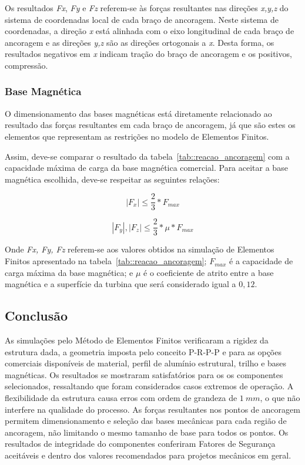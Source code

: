 Os resultados \textit{Fx}, \textit{Fy} e \textit{Fz} referem-se às forças
resultantes nas direções \textit{x,y,z} do sistema de coordenadas local de cada
braço de ancoragem. Neste sistema de coordenadas, a direção \textit{x} está
alinhada com o eixo longitudinal de cada braço de ancoragem e as direções
\textit{y,z} são as direções ortogonais a \textit{x}. 
Desta forma, os resultados negativos em \textit{x} indicam tração do
braço de ancoragem e os positivos, compressão.

\subsubsection{Base Magnética}

O dimensionamento das bases magnéticas está diretamente relacionado ao resultado
das forças resultantes em cada braço de ancoragem, já que são estes os elementos
que representam as restrições no modelo de Elementos Finitos.

Assim, deve-se comparar o resultado da tabela~\ref{tab::reacao_ancoragem} com a
capacidade máxima de carga da base magnética comercial. Para aceitar a base
magnética escolhida, deve-se respeitar as seguintes relações:

 \begin{equation*}
	|F_{x}|\leq\frac{2}{3}*F_{max}
\end{equation*}

 \begin{equation*}
	|F_{y}|,|F_{z}|\leq\frac{2}{3}*\mu*F_{max}
\end{equation*}

Onde \textit{Fx, Fy, Fz} referem-se aos valores obtidos na simulação de
Elementos Finitos apresentado na tabela~\ref{tab::reacao_ancoragem};
$F_{max}$ é a capacidade de carga máxima da base magnética; e $\mu$ é o
coeficiente de atrito entre a base magnética e a superfície da turbina que será
considerado igual a $0,12$.

\subsection{Conclusão}
As simulações pelo Método de Elementos Finitos verificaram a rigidez da
estrutura dada, a geometria imposta pelo conceito P-R-P-P e para as opções
comerciais disponíveis de material, perfil de alumínio estrutural, trilho e bases
magnéticas.
Os resultados se mostraram satisfatórios para os os componentes selecionados,
ressaltando que foram considerados casos extremos de operação. A flexibilidade
da estrutura causa erros com ordem de grandeza de $1~mm$, o que não interfere na
qualidade do processo.
As forças resultantes nos pontos de ancoragem permitem dimensionamento e seleção
das bases mecânicas para cada região de ancoragem, não limitando o mesmo tamanho
de base para todos os pontos.
Os resultados de integridade do componentes conferiram Fatores de Segurança
aceitáveis e dentro dos valores recomendados para projetos mecânicos em geral.
